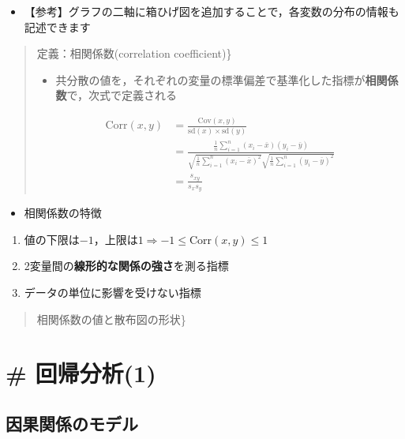 \documentclass[
]{book}
\providecommand{\tightlist}{%
  \setlength{\itemsep}{0pt}\setlength{\parskip}{0pt}}
\theoremstyle{definition}
\theoremstyle{definition}
\theoremstyle{definition}
\theoremstyle{definition}
\theoremstyle{remark}
\begin{document}
\begin{itemize}
\tightlist
\item
  【参考】グラフの二軸に箱ひげ図を追加することで，各変数の分布の情報も記述できます
\end{itemize}

\begin{quote}
定義：相関係数(correlation coefficient)\}

\begin{itemize}
\tightlist
\item
  共分散の値を，それぞれの変量の標準偏差で基準化した指標が\textbf{相関係数}で，次式で定義される
\end{itemize}

\begin{align*}
\text{Corr}(x,y)
&=\frac{\text{Cov}(x,y)}{\text{sd}(x) \times \text{sd}(y)} \\
&=\frac{\frac{1}{n}\sum_{i=1}^n (x_i-\bar{x})(y_i-\bar{y})}
{\sqrt{\frac{1}{n}\sum_{i=1}^n (x_i-\bar{x})^2}
\sqrt{\frac{1}{n}\sum_{i=1}^n (y_i-\bar{y})^2}} \\ 
&=\frac{s_{xy}}{s_{x}s_{y}}
\end{align*}
\end{quote}

\begin{itemize}
\tightlist
\item
  相関係数の特徴
\end{itemize}

\begin{enumerate}
\def\labelenumi{\arabic{enumi}.}
\tightlist
\item
  値の下限は\(-1\)，上限は\(1\)\sout{\(\Rightarrow\)}\(-1 \le \text{Corr}(x,y) \le 1\)
\item
  2変量間の\textbf{線形的な関係の強さ}を測る指標
\item
  データの単位に影響を受けない指標
\end{enumerate}

\begin{quote}
相関係数の値と散布図の形状\}
\end{quote}

\hypertarget{ux56deux5e30ux5206ux67901}{%
\chapter{\# 回帰分析(1)}\label{ux56deux5e30ux5206ux67901}}

\hypertarget{ux56e0ux679cux95a2ux4fc2ux306eux30e2ux30c7ux30eb}{%
\section{因果関係のモデル}\label{ux56e0ux679cux95a2ux4fc2ux306eux30e2ux30c7ux30eb}}
\end{document}
